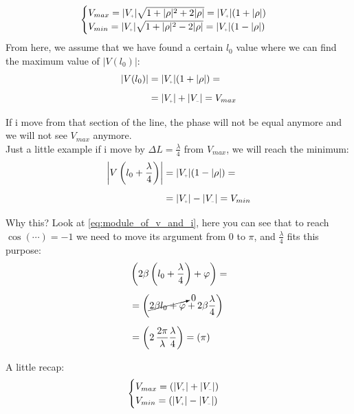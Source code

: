 \begin{equation}
    \begin{cases}
        V_{max} =|V\bottomPlus|\sqrt{1+|\rho|^2+2|\rho|}=|V\bottomPlus|(1+|\rho|)\\
        V_{min} =|V\bottomPlus|\sqrt{1+|\rho|^2-2|\rho|}=|V\bottomPlus|(1-|\rho|)
    \end{cases}\label{eq:vmin_e_vmax}
\end{equation}
From here, we assume that we have found a certain $l_0$ value where we can find the maximum value of $|V(l_0)|$:
\begin{align}
    \begin{split}
    |V(l_0)|&=|V\bottomPlus|(1+|\rho|)=\\[5pt]
    &=|V\bottomPlus|+|V\bottomMinus|=V_{max}\\[5pt]
    \end{split}
\end{align}
If i move from that section of the line, the phase will not be equal anymore and we will not see $V_{max}$ anymore.\\
Just a little example if i move by $\Delta L=\frac{\lambda}{4}$ from $V_{max}$, we will reach the minimum:
\begin{align}
    \begin{split}
        \left|V\left(l_0+\frac{\lambda}{4}\right)\right|&=|V\bottomPlus|(1-|\rho|)=\\[5pt]
        &=|V\bottomPlus|-|V\bottomMinus|=V_{min}\\[5pt]
    \end{split}\label{eq:v_minimum}
\end{align}
Why this? Look at \cref{eq:module_of_v_and_i}, here you can see that to reach $\cos(\cdots)=-1$ we need to move its argument from $0$ to $\pi$, and $\frac{\lambda}{4}$ fits this purpose:
\begin{align}
    \begin{split}
        &\left(2\beta \left(l_0+\frac{\lambda}{4}\right) +\varphi\right) = \\[5pt]
        &=\left(\cancelto{0}{2\beta l_0 +\varphi} +2\beta \frac{\lambda}{4}\right)\\[5pt]
        &=\left(2\,\frac{2\pi}{\lambda} \frac{\lambda}{4} \right)=(\pi)\\[5pt]
    \end{split}
\end{align}
A little recap:
\begin{equation}
    \begin{cases}
        V_{max} =(|V\bottomPlus|+|V\bottomMinus|)\\
        V_{min} =(|V\bottomPlus|-|V\bottomMinus|)
    \end{cases}
\end{equation}
